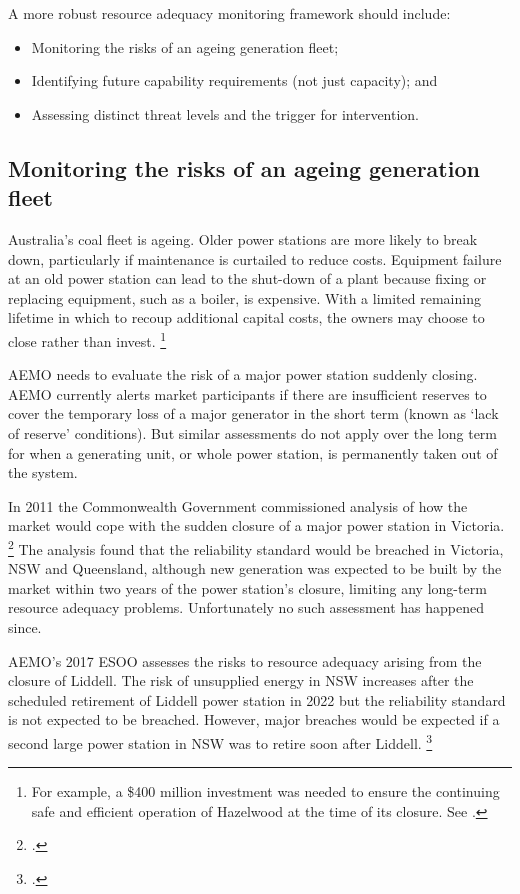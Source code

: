 \documentclass[FrontPage]{grattan}
\begin{document}
A more robust resource adequacy monitoring framework should include:
\begin{itemize}
    \item Monitoring the risks of an ageing generation fleet;
    \item Identifying future capability requirements (not just capacity); and
    \item Assessing distinct threat levels and the trigger for intervention.
\end{itemize}

\subsection{Monitoring the risks of an ageing generation fleet}\label{subsec:monitoring-the-risks-of-an-ageing-generation-fleet} 
Australia’s coal fleet is ageing. Older power stations are more likely to break down, particularly if maintenance is curtailed to reduce costs. Equipment failure at an old power station can lead to the shut-down of a plant because fixing or replacing equipment, such as a boiler, is expensive. With a limited remaining lifetime in which to recoup additional capital costs, the owners may choose to close rather than invest.%
\footnote{For example, a \$400 million investment was needed to ensure the continuing safe and efficient operation of Hazelwood at the time of its closure. See \textcite{ABC2016HazelwoodClosing}.}

AEMO needs to evaluate the risk of a major power station suddenly closing. AEMO currently alerts market participants if there are insufficient reserves to cover the temporary loss of a major generator in the short term (known as `lack of reserve' conditions). But similar assessments do not apply over the long term for when a generating unit, or whole power station, is permanently taken out of the system.

In 2011 the Commonwealth Government commissioned analysis of how the market would cope with the sudden closure of a major power station in Victoria.%
\footcite{DRET2011NESA}
The analysis found that the reliability standard would be breached in Victoria, NSW and Queensland, although new generation was expected to be built by the market within two years of the power station's closure, limiting any long-term resource adequacy problems. Unfortunately no such assessment has happened since.

AEMO's 2017 ESOO assesses the risks to resource adequacy arising from the closure of Liddell. The risk of unsupplied energy in NSW increases after the scheduled retirement of Liddell power station in 2022 but the reliability standard is not expected to be breached. However, major breaches would be expected if a second large power station in NSW was to retire soon after Liddell.%
\footcite{AEMO2017ESOO}
\end{document}
